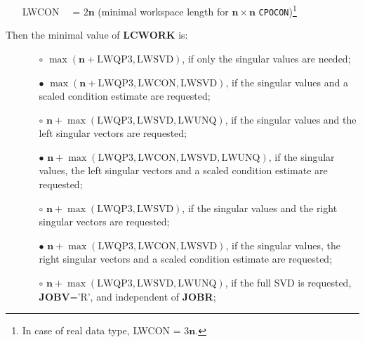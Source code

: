 \documentclass[12pt, a4paper, final]{article}
\numberwithin{equation}{section}
\begin{document}
\begin{itemize}
\begin{itemize}
\begin{itemize}
			\item[] LWCON \ \  = $2 \mathbf{n}$ (minimal workspace length for  $\mathbf{n} \times \mathbf{n}$ \texttt{CPOCON})\footnote{In case of real data type, LWCON = $3\mathbf{n}$.}
		\end{itemize}
		Then the minimal value of \textbf{LCWORK} is:
		\begin{itemize} 	     
			\item[\framebox{$\Sigma$}] \begin{itemize} \item[$\circ$] $\max( \mathbf{n} + \mbox{LWQP3}, \mbox{LWSVD} )$, if only the singular values are needed;
				\item[$\bullet$] $\max( \mathbf{n} + \mbox{LWQP3}, \mbox{LWCON}, \mbox{LWSVD})$, if the singular values and a scaled condition estimate are requested;
			\end{itemize}
			\item[\framebox{$\Sigma, U$}] \begin{itemize}\item[$\circ$] $\mathbf{n} + \max( \mbox{LWQP3}, \mbox{LWSVD}, \mbox{LWUNQ} )$, if the singular values and the left  singular vectors are requested;
				\item[$\bullet$] $\mathbf{n} + \max( \mbox{LWQP3}, \mbox{LWCON}, \mbox{LWSVD}, \mbox{LWUNQ} )$, if the singular values, the left  singular vectors and a scaled condition estimate are requested;
			\end{itemize}	
			\item[\framebox{$\Sigma, V$}] \begin{itemize}\item[$\circ$] $\mathbf{n} + \max( \mbox{LWQP3}, \mbox{LWSVD} )$,  if the singular values and the right
				singular vectors are requested;
				\item[$\bullet$] $\mathbf{n} + \max( \mbox{LWQP3}, \mbox{LWCON}, \mbox{LWSVD} )$,  if the singular values, the right
				singular vectors and a scaled condition estimate are requested; 
			\end{itemize}
			\item[\framebox{$\Sigma, U, V$}] \begin{itemize} \item[$\circ$] $\mathbf{n} + \max( \mbox{LWQP3}, \mbox{LWSVD}, \mbox{LWUNQ} )$, if the full SVD is requested, \textbf{JOBV}='R', and independent of \textbf{JOBR};

\end{itemize}
\end{itemize}
\end{itemize}
\end{itemize}
\end{document}
